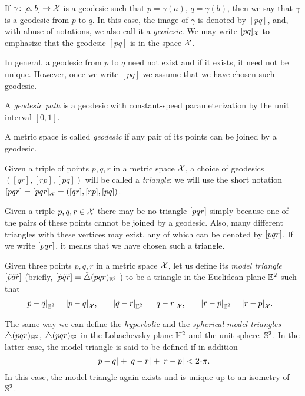 If $\gamma\colon[a,b]\to \mathcal{X}$ is a geodesic such that $p=\gamma(a)$, $q=\gamma(b)$, then we say that $\gamma$ is a geodesic from $p$ to $q$.
In this case, the image of $\gamma$ is denoted by $[p q]$\index{$[{*}{*}]$}, and, with abuse of notations, we also call it a \emph{geodesic}.
We may write $[p q]_{\mathcal{X}}$ 
to emphasize that the geodesic $[p q]$ is in the space  ${\mathcal{X}}$.

In general, a geodesic from $p$ to $q$ need not exist and if it exists, it need not  be unique.  
However, once we write $[p q]$ we assume that we have chosen such geodesic.

A \emph{geodesic path} is a geodesic with constant-speed parameterization by the unit interval $[0,1]$.

A metric space is called \emph{geodesic} if any pair of its points can be joined by a geodesic.

Given a triple of points $p,q,r$ in a metric space $\mathcal{X}$, a choice of geodesics $([q r], [r p], [p q])$ will be called a \emph{triangle}; we will use the short notation 
$[pqr]=[pqr]_{\mathcal{X}}=([q r], [r p], [p q])$\index{$\trig {{*}}{{*}}{{*}}$}.

Given a triple $p,q,r\in \mathcal{X}$ there may be no triangle 
$[pqr]$ simply because one of the pairs of these points cannot be joined by a geodesic.
Also, many different triangles with these vertices may exist, any of which can be denoted by $[pqr]$.
If we write $[pqr]$, it means that we have chosen such a triangle.

Given three points $p,q,r$ in a metric space $\mathcal{X}$,
let us define its \emph{model triangle} $[\tilde p\tilde q\tilde r]$ 
(briefly, 
$[\tilde p\tilde q\tilde r]=\tilde\triangle(p q r)_{\mathbb{E}^2}$%
\index{$\modtrig$}) to be a triangle in the Euclidean plane $\mathbb{E}^2$ such that
\begin{align*}\dist{\tilde p}{\tilde q}{\EE^2}&=\dist{p}{q}{\spc{X}},
&
\quad\dist{\tilde q}{\tilde r}{\EE^2}&=\dist{q}{r}{\spc{X}},
&
\quad\dist{\tilde r}{\tilde p}{\EE^2}&=\dist{r}{p}{\spc{X}}.
\end{align*}

The same way we can define the \emph{hyperbolic} and the \emph{spherical model triangles} $\tilde\triangle(p q r)_{\mathbb{H}^2}$, $\tilde\triangle(p q r)_{\mathbb{S}^2}$
in the Lobachevsky plane $\mathbb{H}^2$ and the unit sphere~$\mathbb{S}^2$.
In the latter case, the model triangle is said to be defined if in addition
\[\dist{p}{q}{}+\dist{q}{r}{}+\dist{r}{p}{}< 2\cdot\pi.\]
In this case, the model triangle again exists and is unique up to an isometry of~$\mathbb{S}^2$.

